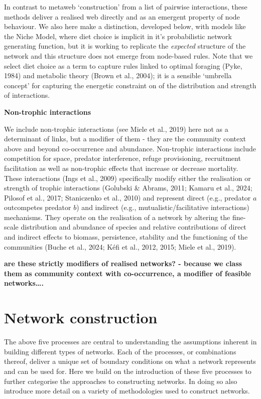\documentclass[
]{article}
\begin{document}
In contrast to metaweb `construction' from a list of pairwise
interactions, these methods deliver a realised web directly and as an
emergent property of node behaviour. We also here make a distinction,
developed below, with models like the Niche Model, where diet choice is
implicit in it's probabilistic network generating function, but it is
working to replicate the \emph{expected} structure of the network and
this structure does not emerge from node-based rules. Note that we
select diet choice as a term to capture rules linked to optimal foraging
(Pyke, 1984) and metabolic theory (Brown et al., 2004); it is a sensible
`umbrella concept' for capturing the energetic constraint on of the
distribution and strength of interactions.

\textbf{Non-trophic interactions}

We include non-trophic interactions (see Miele et al., 2019) here not as
a determinant of links, but a modifier of them - they are the community
context above and beyond co-occurrence and abundance. Non-trophic
interactions include competition for space, predator interference,
refuge provisioning, recruitment facilitation as well as non-trophic
effects that increase or decrease mortality. These interactions (Ings et
al., 2009) specifically modify either the realisation or strength of
trophic interactions (Golubski \& Abrams, 2011; Kamaru et al., 2024;
Pilosof et al., 2017; Staniczenko et al., 2010) and represent direct
(e.g., predator \(a\) outcompetes predator \(b\)) and indirect (e.g.,
mutualistic/facilitative interactions) mechanisms. They operate on the
realisation of a network by altering the fine-scale distribution and
abundance of species and relative contributions of direct and indirect
effects to biomass, persistence, stability and the functioning of the
communities (Buche et al., 2024; Kéfi et al., 2012, 2015; Miele et al.,
2019).

\textbf{are these strictly modifiers of realised networks? - because we
class them as community context with co-occurrence, a modifier of
feasible networks\ldots.}

\section{Network construction}\label{sec-construct}

The above five processes are central to understanding the assumptions
inherent in building different types of networks. Each of the processes,
or combinations thereof, deliver a unique set of boundary conditions on
what a network represents and can be used for. Here we build on the
introduction of these five processes to further categorise the
approaches to constructing networks. In doing so also introduce more
detail on a variety of methodologies used to construct networks.
\end{document}
